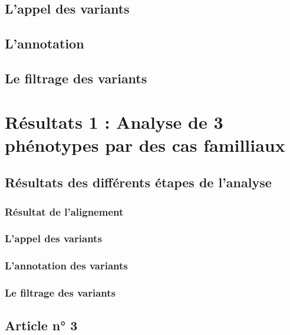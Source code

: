 \documentclass[12pt,twoside]{ugathesis}
\begin{document}
\subsection{L'appel des variants}\label{lappel-des-variants}

\subsection{L'annotation}\label{lannotation}

\subsection{Le filtrage des variants}\label{le-filtrage-des-variants-1}

\section{Résultats 1 : Analyse de 3 phénotypes par des cas
familliaux}\label{resultats-1-analyse-de-3-phenotypes-par-des-cas-familliaux}

\subsection{Résultats des différents étapes de
l'analyse}\label{resultats-des-differents-etapes-de-lanalyse}

\subsubsection{Résultat de l'alignement}\label{resultat-de-lalignement}

\subsubsection{L'appel des variants}\label{lappel-des-variants-1}

\subsubsection{L'annotation des
variants}\label{lannotation-des-variants-1}

\subsubsection{Le filtrage des
variants}\label{le-filtrage-des-variants-2}

\subsection{Article n° 3}\label{article-n-3}
\end{document}
